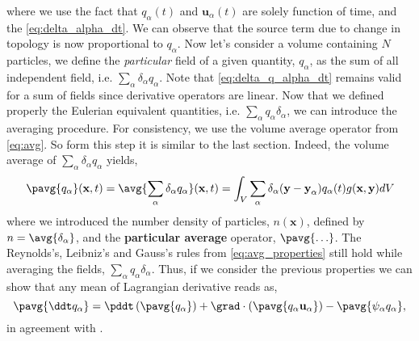where we use the fact that $q_\alpha(t)$ and $\textbf{u}_\alpha(t)$ are solely function of time, and the \ref{eq:delta_alpha_dt}.
We can observe that the source term due to change in topology is now proportional to $q_\alpha$. 
Now let's consider a volume containing $N$ particles, we define the \textit{particular} field of a given quantity, $q_\alpha$, as the sum of all independent field, i.e. $\sum_\alpha \delta_\alpha q_\alpha$.
Note that \ref{eq:delta_q_alpha_dt} remains valid for a sum of fields since derivative operators are linear.  
Now that we defined properly the Eulerian equivalent quantities, i.e. $\sum_\alpha q_\alpha \delta_\alpha$, we can introduce the averaging procedure. 
For consistency, we use the volume average operator from \ref{eq:avg}.
So form this step it is similar to the last section. 
Indeed, the volume average of $\sum_\alpha \delta_\alpha q_\alpha$ yields, 
\begin{equation*}
    \pavg{q_\alpha}(\textbf{x},t)
    = \avg{\sum_\alpha\delta_\alpha q_\alpha} (\textbf{x},t)
    = \int_V 
    \sum_\alpha \delta_\alpha(\textbf{y}- \textbf{y}_\alpha) q_\alpha(t)  
    g(\textbf{x},\textbf{y}) 
    dV
    \label{eq:avg_p}
\end{equation*}
where we introduced the number density of particles, $n(\textbf{x})$, defined by $n = \avg{\delta_\alpha}$, and the \textbf{particular average} operator, $\pavg{\ldots}$.  
The Reynolds’s, Leibniz's and Gauss's rules from \ref{eq:avg_properties} still hold while averaging the fields, $\sum_\alpha q_\alpha \delta_\alpha$.
Thus, if we consider the previous properties we can show that any mean of Lagrangian derivative reads as, 
\begin{equation}
    \pavg{\ddt q_\alpha}
    = \pddt \left(\pavg{q_\alpha}\right)
    + \grad \cdot \left(\pavg{q_\alpha \textbf{u}_\alpha}\right)
    - \pavg{\psi_\alpha q_\alpha}
    ,\label{eq:q_alpha_dt_avg}
\end{equation}
in agreement with \citep{anderson1967fluid}.

